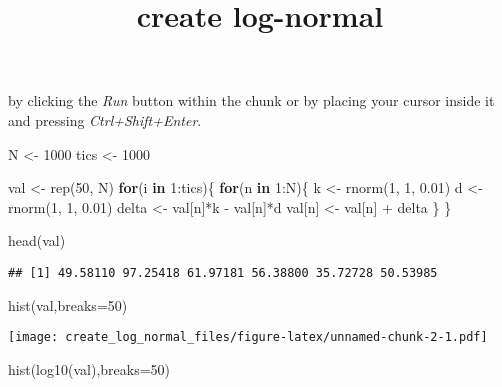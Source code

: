 \documentclass[
]{article}
\title{create log-normal}
\author{}
\date{\vspace{-2.5em}}
\newenvironment{Shaded}{\begin{snugshade}}{\end{snugshade}}
\newcommand{\AttributeTok}[1]{\textcolor[rgb]{0.77,0.63,0.00}{#1}}
\newcommand{\ControlFlowTok}[1]{\textcolor[rgb]{0.13,0.29,0.53}{\textbf{#1}}}
\newcommand{\DecValTok}[1]{\textcolor[rgb]{0.00,0.00,0.81}{#1}}
\newcommand{\FloatTok}[1]{\textcolor[rgb]{0.00,0.00,0.81}{#1}}
\newcommand{\FunctionTok}[1]{\textcolor[rgb]{0.00,0.00,0.00}{#1}}
\newcommand{\NormalTok}[1]{#1}
\newcommand{\OtherTok}[1]{\textcolor[rgb]{0.56,0.35,0.01}{#1}}
\newcommand{\SpecialCharTok}[1]{\textcolor[rgb]{0.00,0.00,0.00}{#1}}
\begin{document}
\maketitle

by clicking the \emph{Run} button within the chunk or by placing your
cursor inside it and pressing \emph{Ctrl+Shift+Enter}.

\begin{Shaded}
\begin{Highlighting}[]
\NormalTok{N }\OtherTok{\textless{}{-}} \DecValTok{1000}
\NormalTok{tics }\OtherTok{\textless{}{-}} \DecValTok{1000}

\NormalTok{val }\OtherTok{\textless{}{-}} \FunctionTok{rep}\NormalTok{(}\DecValTok{50}\NormalTok{, N)}
\ControlFlowTok{for}\NormalTok{(i }\ControlFlowTok{in} \DecValTok{1}\SpecialCharTok{:}\NormalTok{tics)\{}
  \ControlFlowTok{for}\NormalTok{(n }\ControlFlowTok{in} \DecValTok{1}\SpecialCharTok{:}\NormalTok{N)\{}
\NormalTok{    k }\OtherTok{\textless{}{-}} \FunctionTok{rnorm}\NormalTok{(}\DecValTok{1}\NormalTok{, }\DecValTok{1}\NormalTok{, }\FloatTok{0.01}\NormalTok{)}
\NormalTok{    d }\OtherTok{\textless{}{-}} \FunctionTok{rnorm}\NormalTok{(}\DecValTok{1}\NormalTok{, }\DecValTok{1}\NormalTok{, }\FloatTok{0.01}\NormalTok{)}
\NormalTok{    delta }\OtherTok{\textless{}{-}}\NormalTok{ val[n]}\SpecialCharTok{*}\NormalTok{k }\SpecialCharTok{{-}}\NormalTok{ val[n]}\SpecialCharTok{*}\NormalTok{d}
\NormalTok{    val[n] }\OtherTok{\textless{}{-}}\NormalTok{ val[n] }\SpecialCharTok{+}\NormalTok{ delta}
\NormalTok{  \}}
\NormalTok{\}}

\FunctionTok{head}\NormalTok{(val)}
\end{Highlighting}
\end{Shaded}

\begin{verbatim}
## [1] 49.58110 97.25418 61.97181 56.38800 35.72728 50.53985
\end{verbatim}

\begin{Shaded}
\begin{Highlighting}[]
\FunctionTok{hist}\NormalTok{(val,}\AttributeTok{breaks=}\DecValTok{50}\NormalTok{)}
\end{Highlighting}
\end{Shaded}

\texttt{[image: create\_log\_normal\_files/figure-latex/unnamed-chunk-2-1.pdf]}

\begin{Shaded}
\begin{Highlighting}[]
\FunctionTok{hist}\NormalTok{(}\FunctionTok{log10}\NormalTok{(val),}\AttributeTok{breaks=}\DecValTok{50}\NormalTok{)}
\end{Highlighting}
\end{Shaded}
\end{document}
